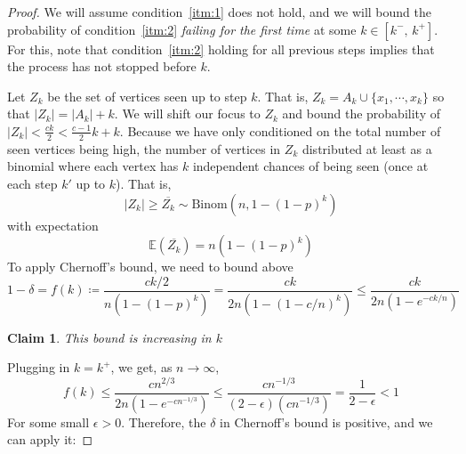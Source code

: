 \documentclass{amsart}
\theoremstyle{plain}
\newtheorem*{claim}{\textbf{Claim}}
\theoremstyle{definition}
\begin{document}
    \begin{proof}
        \vspace{-3mm}
        We will assume condition~\eqref{itm:1} does not hold, and we will bound the probability of
        condition~\eqref{itm:2} \emph{failing for the first time} at some $k \in [k^{-}, \, k^{+}]$.
        For this, note that condition~\eqref{itm:2} holding for all previous steps implies that
        the process has not stopped before $k$.

        \noindent Let $Z_k$ be the set of vertices seen up to step $k$.
        That is, $Z_k = A_k \cup \{x_1, \cdots, x_k\}$ so that $|Z_k| = |A_k| + k$.
        We will shift our focus to $Z_k$ and bound the probability of $|Z_k| < \frac{ck}{2} < \frac{c-1}{2}k + k$.
        Because we have only conditioned on the total number of seen vertices being high,
        the number of vertices in $Z_k$ distributed at least as a binomial
        where each vertex has $k$ independent chances of being seen (once at each step $k'$ up to $k$).
        That is,
        \begin{equation}
            |Z_k| \geq \overline{Z_k} \sim \text{Binom}\left(n, 1 - (1 - p)^k\right)
            \label{eq:binom}
        \end{equation}
        with expectation
        \begin{equation}
            \mathbb{E}\left(\overline{Z_k}\right) = n\left(1 - (1 - p)^k\right)
            \label{eq:expec}
        \end{equation}
    To apply Chernoff's bound, we need to bound above
    \begin{equation}
        1 - \delta = f(k) \coloneqq \frac{ck/2}{n\left(1 - (1 - p)^k\right)} =
        \frac{ck}{2n\left(1 - (1 - c/n)^k\right)} \leq \frac{ck}{2n\left(1 - e^{-ck/n}\right)}
        \label{eq:ff}
    \end{equation}
    \begin{claim}
        This bound is increasing in $k$ %
    \end{claim}
    \noindent Plugging in $k = k^{+}$, we get, as $n \to \infty$,
    \begin{equation}
        f(k) \leq
        \frac{cn^{2/3}}{2n\left(1 - e^{-cn^{-1/3}}\right)} \leq
        \frac{cn^{-1/3}}{(2-\epsilon)\left(cn^{-1/3}\right)} = \frac{1}{2-\epsilon} < 1
        \label{eq:fbound_2}
    \end{equation}
    For some small $\epsilon > 0$.
    Therefore, the $\delta$ in Chernoff's bound is positive, and we can apply it:

\end{proof}
\end{document}
